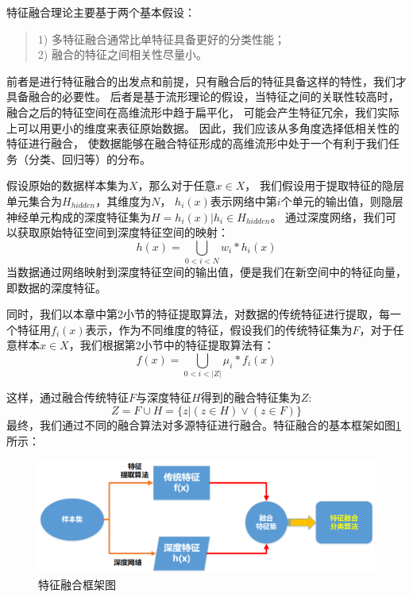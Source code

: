 特征融合理论主要基于两个基本假设：
\begin{quote} 
	1) 多特征融合通常比单特征具备更好的分类性能；\\
	2) 融合的特征之间相关性尽量小。
\end{quote}

前者是进行特征融合的出发点和前提，只有融合后的特征具备这样的特性，我们才具备融合的必要性。
后者是基于流形理论的假设，当特征之间的关联性较高时，融合之后的特征空间在高维流形中趋于扁平化，
可能会产生特征冗余，我们实际上可以用更小的维度来表征原始数据。
因此，我们应该从多角度选择低相关性的特征进行融合，
使数据能够在融合特征形成的高维流形中处于一个有利于我们任务（分类、回归等）的分布。\par

假设原始的数据样本集为$X$，那么对于任意${x \in X}$，
我们假设用于提取特征的隐层单元集合为$H_{hidden}$，其维度为$N$，
$h_i(x)$表示网络中第$i$个单元的输出值，则隐层神经单元构成的深度特征集为$H={h_i(x)|h_i \in H_{hidden}}$。
通过深度网络，我们可以获取原始特征空间到深度特征空间的映射：
\begin{equation}
	h(x) = \bigcup_{0<i<N} w_i * h_{i}(x)
\end{equation}
当数据通过网络映射到深度特征空间的输出值，便是我们在新空间中的特征向量，即数据的深度特征。\par

同时，我们以本章中第2小节的特征提取算法，对数据的传统特征进行提取，每一个特征用$f_{i}(x)$表示，作为不同维度的特征，假设我们的传统特征集为$F$，对于任意样本$x \in X$，我们根据第2小节中的特征提取算法有：
\begin{equation}
	f(x) = \bigcup_{0<i<|Z|}\mu_{i} * f_{i}(x)
\end{equation}

这样，通过融合传统特征$F$与深度特征$H$得到的融合特征集为$Z$:
\begin{equation}
	Z =F \cup H = \{ z | (z \in H) \vee (z \in F) \}
\end{equation}
最终，我们通过不同的融合算法对多源特征进行融合。特征融合的基本框架如图\ref{sec:fig_4_1}所示：

\begin{figure}[!h]
	\centering
	\includegraphics[scale=0.5]{figures/chapter_4/fea_combine.png}
	\caption{特征融合框架图}\label{sec:fig_4_1}
\end{figure}

